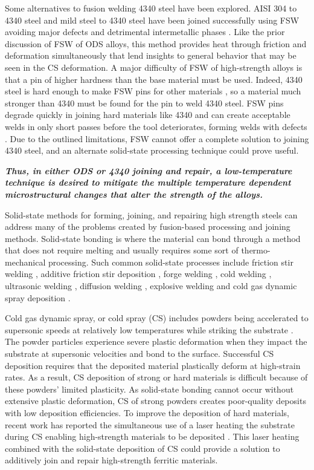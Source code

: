 	Some alternatives to fusion welding 4340 steel have been explored. AISI 304 to 4340 steel and mild steel to 4340 steel have been joined successfully using FSW avoiding major defects and detrimental intermetallic phases \cite{RN526, RN1454}. Like the prior discussion of FSW of ODS alloys, this method provides heat through friction and deformation simultaneously that lend insights to general behavior that may be seen in the CS deformation. A major difficulty of FSW of high-strength alloys is that a pin of higher hardness than the base material must be used. Indeed, 4340 steel is hard enough to make FSW pins for other materials \cite{RN427}, so a material much stronger than 4340 must be found for the pin to weld 4340 steel. FSW pins degrade quickly in joining hard materials like 4340 and can create acceptable welds in only short passes before the tool deteriorates, forming welds with defects \cite{RN438}. Due to the outlined limitations, FSW cannot offer a complete solution to joining 4340 steel, and an alternate solid-state processing technique could prove useful.
	
	\textbf{\textit{Thus, in either ODS or 4340 joining and repair, a low-temperature technique is desired to mitigate the multiple temperature dependent microstructural changes that alter the strength of the alloys.}}
	
	Solid-state methods for forming, joining, and repairing high strength steels can address many of the problems created by fusion-based processing and joining methods. Solid-state bonding is where the material can bond through a method that does not require melting and usually requires some sort of thermo-mechanical processing. Such common solid-state processes include friction stir welding \cite{RN583}, additive friction stir deposition \cite{RN3432}, forge welding \cite{RN3433}, cold welding \cite{RN3434}, ultrasonic welding \cite{RN3436}, diffusion welding \cite{RN3437}, explosive welding \cite{RN799,RN422} and cold gas dynamic spray deposition \cite{RN3390}. 
	
	Cold gas dynamic spray, or cold spray (CS) includes powders being accelerated to supersonic speeds at relatively low temperatures while striking the substrate \cite{RN3390}. The powder particles experience severe plastic deformation when they impact the substrate at supersonic velocities and bond to the surface. Successful CS deposition requires that the deposited material plastically deform at high-strain rates. As a result, CS deposition of strong or hard materials is difficult because of these powders' limited plasticity. As solid-state bonding cannot occur without extensive plastic deformation, CS of strong powders creates poor-quality deposits with low deposition efficiencies. To improve the deposition of hard materials, recent work has reported the simultaneous use of a laser heating the substrate during CS enabling high-strength materials to be deposited \cite{RN173}. This laser heating combined with the solid-state deposition of CS could provide a solution to additively join and repair high-strength ferritic materials.
	
